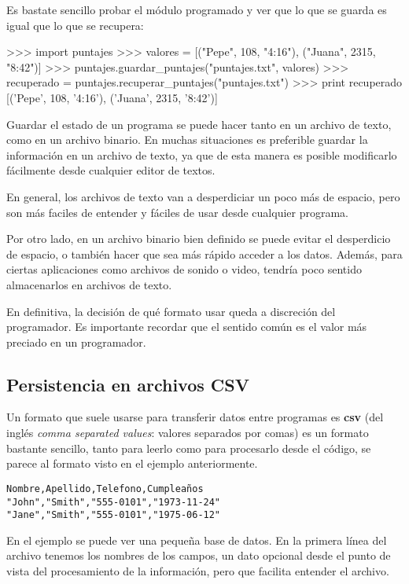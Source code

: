 Es bastate sencillo probar el módulo programado y ver que lo que se guarda
es igual que lo que se recupera:

\begin{codigo-python-sn}
>>> import puntajes
>>> valores = [("Pepe", 108, "4:16"), ("Juana", 2315, "8:42")]
>>> puntajes.guardar_puntajes("puntajes.txt", valores)
>>> recuperado = puntajes.recuperar_puntajes("puntajes.txt")
>>> print recuperado
[('Pepe', 108, '4:16'), ('Juana', 2315, '8:42')]
\end{codigo-python-sn}


Guardar el estado de un programa se puede hacer tanto en un
archivo de texto, como en un archivo binario. En muchas
situaciones es preferible guardar la información en un archivo de
texto, ya que de esta manera es posible modificarlo fácilmente
desde cualquier editor de textos.

En general, los archivos de texto van a desperdiciar un poco más de
espacio, pero son más faciles de entender y fáciles de usar desde
cualquier programa.

Por otro lado, en un archivo binario bien definido se puede evitar el
desperdicio de espacio, o también hacer que sea más rápido acceder a los
datos.  Además, para ciertas aplicaciones como archivos de sonido o video,
tendría poco sentido almacenarlos en archivos de texto.

En definitiva, la decisión de qué formato usar queda a discreción del
programador. Es importante recordar que el sentido común es el valor más
preciado en un programador.

\subsection{Persistencia en archivos CSV}

Un formato que suele usarse para transferir datos entre programas es
\textbf{csv} (del inglés {\it comma separated values}: valores separados
por comas) es un formato bastante sencillo, tanto para leerlo como para
procesarlo desde el código, se parece al formato visto en el ejemplo
anteriormente.

\begin{verbatim}
Nombre,Apellido,Telefono,Cumpleaños
"John","Smith","555-0101","1973-11-24"
"Jane","Smith","555-0101","1975-06-12"
\end{verbatim}

En el ejemplo se puede ver una pequeña base de datos. En la primera línea
del archivo tenemos los nombres de los campos, un dato opcional desde el
punto de vista del procesamiento de la información, pero que facilita
entender el archivo.

